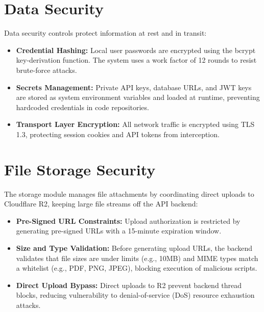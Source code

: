 \section{Data Security}
Data security controls protect information at rest and in transit:
\begin{itemize}
    \item \textbf{Credential Hashing:} Local user passwords are encrypted using the bcrypt key-derivation function. The system uses a work factor of 12 rounds to resist brute-force attacks.
    \item \textbf{Secrets Management:} Private API keys, database URLs, and JWT keys are stored as system environment variables and loaded at runtime, preventing hardcoded credentials in code repositories.
    \item \textbf{Transport Layer Encryption:} All network traffic is encrypted using TLS 1.3, protecting session cookies and API tokens from interception.
\end{itemize}

\section{File Storage Security}
The storage module manages file attachments by coordinating direct uploads to Cloudflare R2, keeping large file streams off the API backend:
\begin{itemize}
    \item \textbf{Pre-Signed URL Constraints:} Upload authorization is restricted by generating pre-signed URLs with a 15-minute expiration window.
    \item \textbf{Size and Type Validation:} Before generating upload URLs, the backend validates that file sizes are under limits (e.g., 10MB) and MIME types match a whitelist (e.g., PDF, PNG, JPEG), blocking execution of malicious scripts.
    \item \textbf{Direct Upload Bypass:} Direct uploads to R2 prevent backend thread blocks, reducing vulnerability to denial-of-service (DoS) resource exhaustion attacks.
\end{itemize}

